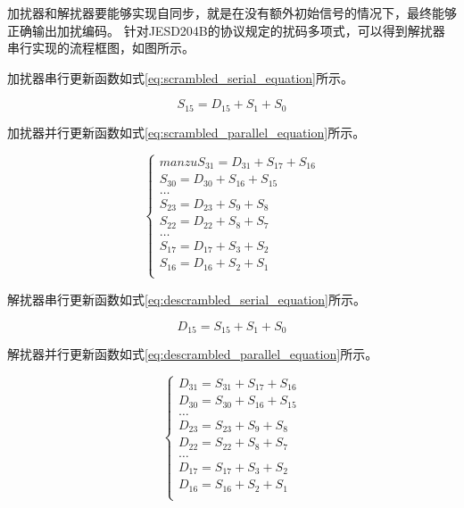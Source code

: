 \documentclass[UTF8]{ctexart}
\begin{document}
加扰器和解扰器要能够实现自同步，就是在没有额外初始信号的情况下，最终能够正确输出加扰编码。
针对JESD204B的协议规定的扰码多项式，可以得到解扰器串行实现的流程框图，如图所示。

加扰器串行更新函数如式\ref{eq:scrambled_serial_equation}所示。

\begin{equation}
\label{eq:scrambled_serial_equation}
S_{15} = D_{15} + S_1 + S_0
\end{equation}

加扰器并行更新函数如式\ref{eq:scrambled_parallel_equation}所示。

\begin{equation}
\label{eq:scrambled_parallel_equation}
\begin{cases}manzu
	S_{31} = D_{31} + S_{17} + S_{16} \\
	S_{30} = D_{30} + S_{16} + S_{15} \\
	\dots							  \\
	S_{23} = D_{23} + S_{9} + S_{8}   \\
	S_{22} = D_{22} + S_{8} + S_{7}   \\
	\dots							  \\
	S_{17} = D_{17} + S_{3} + S_{2}   \\
	S_{16} = D_{16} + S_{2} + S_{1}   \\
\end{cases}
\end{equation}

解扰器串行更新函数如式\ref{eq:descrambled_serial_equation}所示。

\begin{equation}
\label{eq:descrambled_serial_equation}
D_{15} = S_{15} + S_1 + S_0
\end{equation}

解扰器并行更新函数如式\ref{eq:descrambled_parallel_equation}所示。

\begin{equation}
\label{eq:descrambled_parallel_equation}
\begin{cases}
	D_{31} = S_{31} + S_{17} + S_{16} \\
	D_{30} = S_{30} + S_{16} + S_{15} \\
	\dots							  \\
	D_{23} = S_{23} + S_{9} + S_{8}   \\
	D_{22} = S_{22} + S_{8} + S_{7}   \\
	\dots							  \\
	D_{17} = S_{17} + S_{3} + S_{2}   \\
	D_{16} = S_{16} + S_{2} + S_{1}   \\
\end{cases}
\end{equation}
\end{document}
